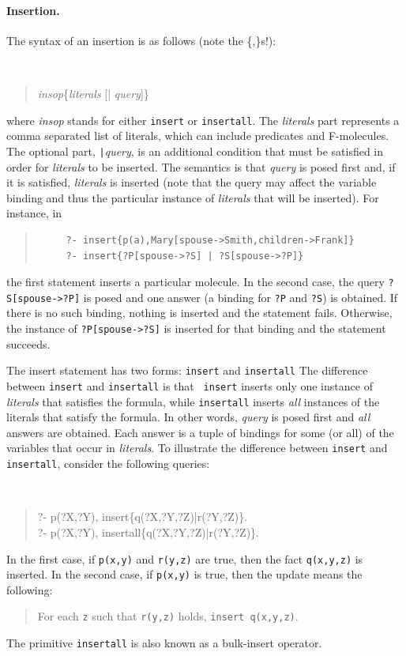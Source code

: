 \documentclass[11pt]{article}
\begin{document}
\paragraph{Insertion.} The syntax of an insertion is as follows (note the
\{,\}s!):
{\tt
\begin{quote}
\emph{insop}\{\emph{literals} [| \emph{query}]\}
\end{quote}
}
\noindent
where {\it insop} stands for either {\tt insert} or {\tt insertall}.
The
{\it literals} part represents a comma separated list of literals,
which can include
predicates and \mbox{F-molecules}. The optional part, {\tt |}{\it query},
is an additional condition that must be satisfied in order for
\emph{literals} to be inserted.
The semantics is that \emph{query} is posed first and, if it is
satisfied, \emph{literals} is inserted (note that the query may affect the
variable binding and thus the particular instance of \emph{literals} that
will be inserted). For instance, in
\begin{quote}
\begin{verbatim}
     ?- insert{p(a),Mary[spouse->Smith,children->Frank]}
     ?- insert{?P[spouse->?S] | ?S[spouse->?P]}
\end{verbatim}
\end{quote}
the first statement inserts a particular molecule. In the second case, the
query {\tt ?S[spouse->?P]} is posed and one answer (a binding for {\tt ?P} and
{\tt ?S}) is obtained. If there is no such binding, nothing is inserted and
the statement fails. Otherwise, the instance of {\tt ?P[spouse->?S]} is
inserted for that binding and the statement succeeds.

The insert statement has two forms: {\tt insert} and {\tt insertall}
The difference between {\tt insert} and {\tt insertall} is that {\tt
  insert} inserts only one instance of \emph{literals} that satisfies the
formula, while {\tt insertall} inserts \emph{all} instances of the literals
that satisfy the formula. In other words, \emph{query} is posed first and
\emph{all} answers are obtained. Each answer is a tuple of bindings for
some (or all) of the variables that occur in \emph{literals}.  To
illustrate the difference between {\tt insert} and {\tt insertall},
consider the following queries:
{\tt
\begin{quote}
      ?- p(?X,?Y), insert\{q(?X,?Y,?Z)|r(?Y,?Z)\}.\\
      ?- p(?X,?Y), insertall\{q(?X,?Y,?Z)|r(?Y,?Z)\}.
\end{quote}
}
In the first case, if {\tt p(x,y)} and {\tt r(y,z)} are true, then the
fact {\tt q(x,y,z)} is inserted. In the second case, if {\tt p(x,y)} is
true, then the update means the following:
\begin{quote}
  For each {\tt z} such that {\tt r(y,z)} holds, {\tt insert q(x,y,z)}.
\end{quote}
The primitive {\tt insertall} is also known as a bulk-insert operator.
\end{document}

